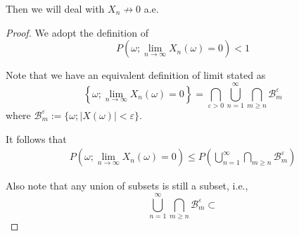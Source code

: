 \documentclass{homework}
\begin{document}
    Then we will deal with $X_n\not\to 0$ a.e.
    \begin{proof}
    We adopt the definition of
    \[P\left(\omega;\lim_{n\to\infty}X_n(\omega)=0\right)<1\]

    Note that we have an equivalent definition of limit stated as
    \[
        \left\{\omega;\lim_{n\to\infty}X_n(\omega)=0\right\}
        =\bigcap_{\varepsilon>0}\bigcup_{n=1}^\infty\bigcap_{m\geq n}
         \mathcal B_m^\varepsilon
    \]
    where $\mathcal B_m^\varepsilon:=\{\omega;|X(\omega)|<\varepsilon\}$.

    It follows that
    \begin{align*}
        P\left(\omega;\lim_{n\to\infty}X_n(\omega)=0\right)
        \leq P\left(\bigcup_{n=1}^\infty\bigcap_{m\geq n}\mathcal B_m^\varepsilon\right)
    \end{align*}

    Also note that any union of subsets is still a subset, i.e.,
    \[\bigcup_{n=1}^\infty\bigcap_{m\geq n}\mathcal B_m^\varepsilon
    \subset\]
    \end{proof}
\end{document}
